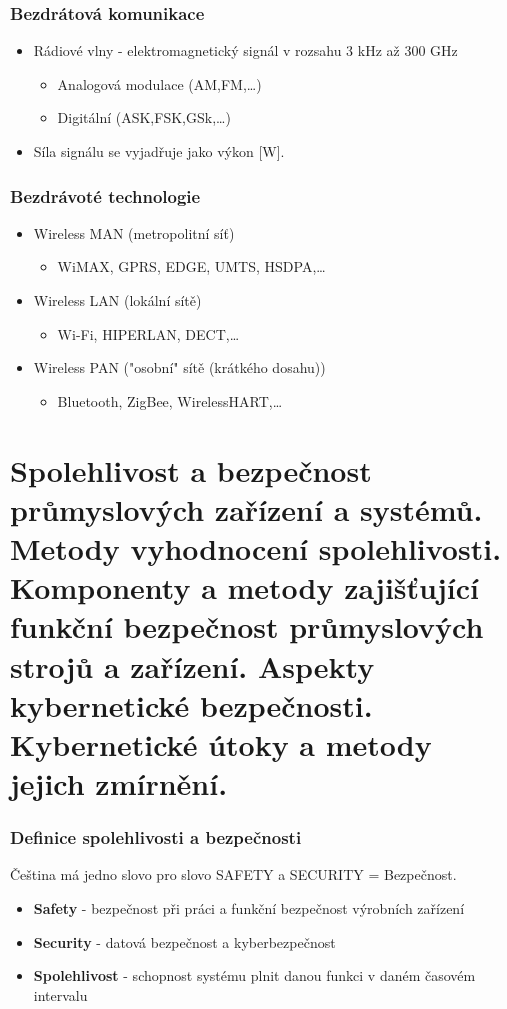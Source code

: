 \subsubsection*{Bezdrátová komunikace}
\begin{itemize}
  \item Rádiové vlny - elektromagnetický signál v rozsahu 3 kHz až 300 GHz \begin{itemize}
    \item Analogová modulace (AM,FM,\dots)
    \item Digitální (ASK,FSK,GSk,\dots)
  \end{itemize}
  \item Síla signálu se vyjadřuje jako výkon [W].
\end{itemize}

\subsubsection*{Bezdrávoté technologie}
\begin{itemize}
  \item Wireless MAN (metropolitní síť) \begin{itemize}
    \item WiMAX, GPRS, EDGE, UMTS, HSDPA,\dots
  \end{itemize}
  \item Wireless LAN (lokální sítě) \begin{itemize}
    \item Wi-Fi, HIPERLAN, DECT,\dots
  \end{itemize}
  \item Wireless PAN ("osobní" sítě (krátkého dosahu)) \begin{itemize}
    \item Bluetooth, ZigBee, WirelessHART,\dots
  \end{itemize}
\end{itemize}

\section{Spolehlivost a bezpečnost průmyslových zařízení a systémů. Metody vyhodnocení spolehlivosti. Komponenty a metody zajišťující funkční bezpečnost průmyslových strojů a zařízení. Aspekty kybernetické bezpečnosti. Kybernetické útoky a metody jejich zmírnění.}

\subsubsection*{Definice spolehlivosti a bezpečnosti}
Čeština má jedno slovo pro slovo SAFETY a SECURITY = Bezpečnost.
\begin{itemize}
  \item \textbf{Safety} - bezpečnost při práci a funkční bezpečnost výrobních zařízení
  \item \textbf{Security} - datová bezpečnost a kyberbezpečnost
  \item \textbf{Spolehlivost} - schopnost systému plnit danou funkci v daném časovém intervalu
\end{itemize}

